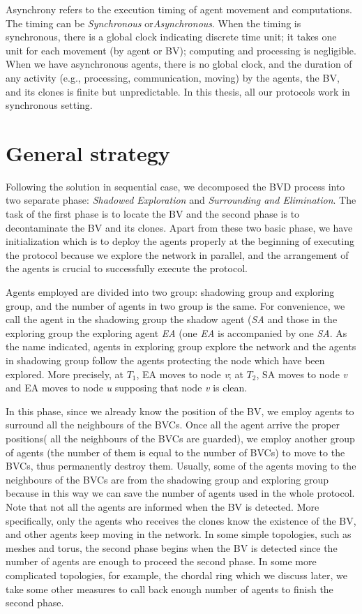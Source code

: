 Asynchrony refers to the execution timing of agent movement and computations. The timing can be {\em Synchronous} or{\em Asynchronous}. When the timing is synchronous, there is a global clock indicating discrete time unit; it takes one unit for each movement (by agent or BV); computing and processing is negligible. When we have asynchronous agents, there is no global clock, and the duration of any activity (e.g., processing, communication, moving) by the agents, the BV, and its clones is finite but unpredictable. In this thesis, all our protocols work in synchronous setting.

\section{ General strategy}
Following the solution in sequential case, we decomposed the BVD process into two separate phase: {\em Shadowed Exploration} and {\em Surrounding and Elimination}. The task of the first phase is to locate the BV and the second phase is to decontaminate the BV and its clones. Apart from these two basic phase, we have initialization which is to deploy the agents properly at the beginning of executing the protocol because we explore the network in parallel, and the arrangement of the agents is crucial to successfully execute the protocol. 

  Agents employed are divided into two group: shadowing group and exploring group, and the number of agents in two group is the same. For convenience, we call the agent in the shadowing group the shadow agent ({\em SA} and those in the exploring group the exploring agent {\em EA} (one {\em EA} is accompanied by one {\em SA}. As the name indicated, agents in exploring group explore the network and the agents in shadowing group follow the agents  protecting the node which have been explored. More precisely, at $T_1$, EA moves to node {\em v}; at $T_2$, SA moves to node {\em v} and EA moves to node {\em u} supposing that node {\em v} is clean. 

In this phase, since we already know the position of the BV, we employ agents to surround all the neighbours of the BVCs. Once all the agent arrive the proper positions( all the neighbours of the BVCs are guarded), we employ another group of agents (the number of them is equal to the number of BVCs) to move to the BVCs, thus permanently destroy them. Usually, some of the agents moving to the neighbours of the BVCs are from the shadowing group and exploring group because in this way we can save the number of agents used in the whole protocol. Note that not all the agents are informed when the BV is detected. More specifically, only the agents who receives the clones know the existence of the BV, and other agents keep moving in the network. In some simple topologies, such as meshes and torus, the second phase begins when the BV is detected since the number of agents are enough to proceed the second phase. In some more complicated topologies, for example, the chordal ring which we discuss later, we take some other measures to call back enough number of agents to finish the second phase.
